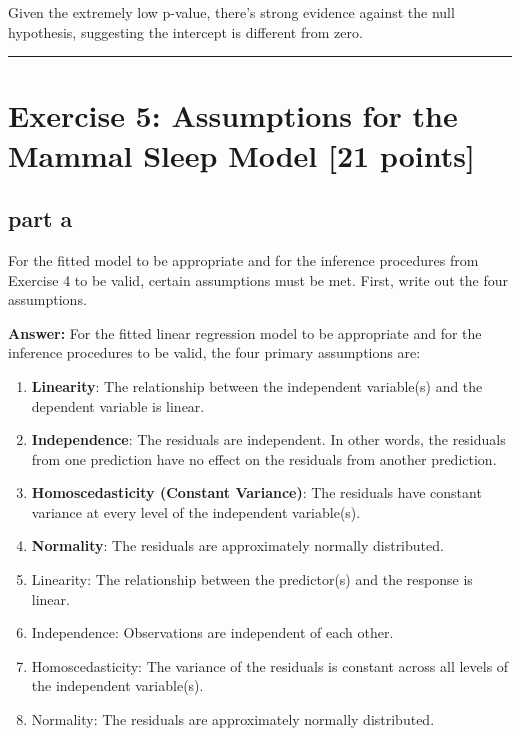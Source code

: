 \documentclass[
]{article}
\begin{document}
Given the extremely low p-value, there's strong evidence against the
null hypothesis, suggesting the intercept is different from zero.

\begin{center}\rule{0.5\linewidth}{0.5pt}\end{center}

\section{Exercise 5: Assumptions for the Mammal Sleep Model {[}21
points{]}}\label{exercise-5-assumptions-for-the-mammal-sleep-model-21-points}

\subsection{part a}\label{part-a-3}

For the fitted model to be appropriate and for the inference procedures
from Exercise 4 to be valid, certain assumptions must be met. First,
write out the four assumptions.

\textbf{Answer:} For the fitted linear regression model to be
appropriate and for the inference procedures to be valid, the four
primary assumptions are:

\begin{enumerate}
\def\labelenumi{\arabic{enumi}.}
\item
  \textbf{Linearity}: The relationship between the independent
  variable(s) and the dependent variable is linear.
\item
  \textbf{Independence}: The residuals are independent. In other words,
  the residuals from one prediction have no effect on the residuals from
  another prediction.
\item
  \textbf{Homoscedasticity (Constant Variance)}: The residuals have
  constant variance at every level of the independent variable(s).
\item
  \textbf{Normality}: The residuals are approximately normally
  distributed.
\item
  Linearity: The relationship between the predictor(s) and the response
  is linear.
\item
  Independence: Observations are independent of each other.
\item
  Homoscedasticity: The variance of the residuals is constant across all
  levels of the independent variable(s).
\item
  Normality: The residuals are approximately normally distributed.
\end{enumerate}
\end{document}
